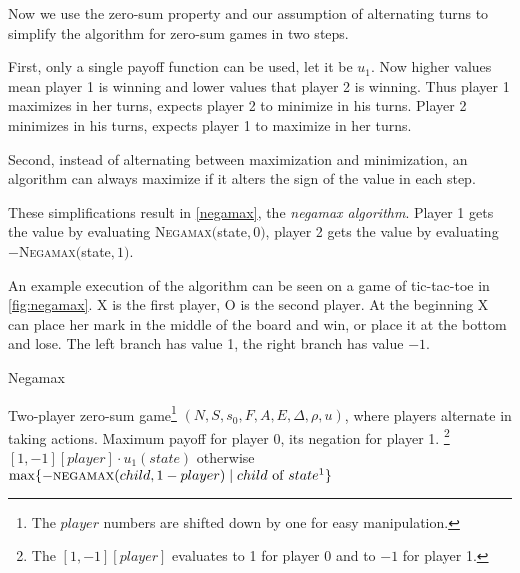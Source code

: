 Now we use the zero-sum property and our assumption of alternating turns
to simplify the algorithm for zero-sum games in two steps.

First, only a single payoff function can be used,
let it be $u_1$. Now higher values mean player 1 is winning and lower
values that player 2 is winning.
Thus player 1 maximizes in her turns, expects
player 2 to minimize in his turns.
Player 2 minimizes in his turns, expects
player 1 to maximize in her turns.

Second, instead of alternating between maximization and minimization, an
algorithm can always maximize if it alters the sign of the value in each
step.

These simplifications result in \autoref{negamax}, the {\em negamax
algorithm}.
Player 1 gets the value by evaluating
\textsc{Negamax}$($state$, 0)$,
player 2 gets the value by evaluating $-$\textsc{Negamax}$($state$, 1)$.

An example execution of the algorithm can be seen on a game of
tic-tac-toe in \autoref{fig:negamax}.
X is the first player, O is the second player. At the beginning X can
place her mark in the middle of the board and win, or place it at the
bottom and lose. The left branch has value 1, the right branch has value
$-1$.


\begin{algorithm}
\caption{Negamax}
\label{negamax}
\begin{algorithmic}[1]
\Input Two-player zero-sum game\footnote{The $player$
numbers are shifted down by one for easy manipulation.}
$(N, S, s_0, F, A, E, \Delta, \rho, u)$, where players
 alternate in taking actions.
\Output Maximum payoff for player 0, its negation for player 1.
    \State \Return\footnote{The
    $[1,-1][player]$ evaluates to 1 for player 0 and to $-1$ for player 1.}
        $[1,-1][player] \cdot u_1(state)$
        otherwise
    \EndIf
    \State \Return $\max \{ - \Call{negamax}{child, 1 - player}
        \mid
        child \text{ of } state\footnote{Precisely
        for all enabled actions $a \in E(state)$ every $child \in \Delta(state, a)$.}
    \}$
\EndFunction
\end{algorithmic}
\end{algorithm}

